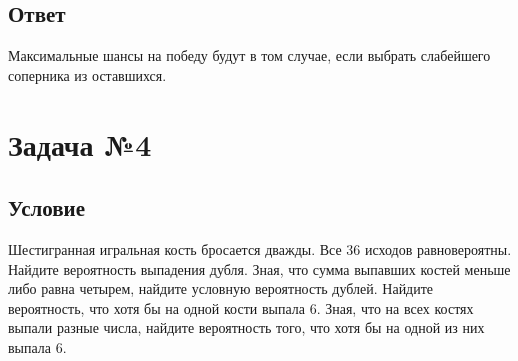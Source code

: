 \documentclass{article}
\begin{document}
\subsection*{Ответ}
Максимальные шансы на победу будут в том случае, если выбрать слабейшего соперника из оставшихся.

\section*{Задача №4}
\subsection*{Условие}
Шестигранная игральная кость бросается дважды. Все 36 исходов
равновероятны. Найдите вероятность выпадения дубля. Зная, что сумма выпавших
костей меньше либо равна четырем, найдите условную вероятность дублей. Найдите
вероятность, что хотя бы на одной кости выпала 6. Зная, что на всех костях выпали
разные числа, найдите вероятность того, что хотя бы на одной из них выпала 6.  
\end{document}
